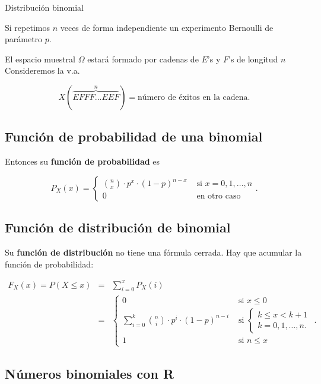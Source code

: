 \documentclass[]{book}
\begin{document}
 Distribución binomial

Si repetimos \(n\) veces de forma independiente un experimento Bernoulli de parámetro \(p\).

El espacio muestral \(\Omega\) estará formado por cadenas de \(E\)'s y \(F\)'s de longitud \(n\)
Consideremos la v.a.

\[X(\overbrace{EFFF\ldots EEF}^{n})=\mbox{número de éxitos en la cadena}.\]

\hypertarget{funciuxf3n-de-probabilidad-de-una-binomial}{%
\subsection{Función de probabilidad de una binomial}\label{funciuxf3n-de-probabilidad-de-una-binomial}}

Entonces su \textbf{función de probabilidad} es

\[
P_{X}(x)=\left\{
\begin{array}{ll}
{n\choose x}\cdot  p^x \cdot(1-p)^{n-x} &\mbox{ si } x=0,1,\ldots,n\\
0  & \mbox{ en otro caso}
\end{array}\right..
\]

\hypertarget{funciuxf3n-de-distribuciuxf3n-de-binomial}{%
\subsection{Función de distribución de binomial}\label{funciuxf3n-de-distribuciuxf3n-de-binomial}}

Su \textbf{función de distribución} no tiene una fórmula cerrada. Hay que acumular la función de probabilidad:

\[
\begin{eqnarray*}
F_{X}(x)=P(X\leq x) & = & \sum_{i=0}^x P_X(i)\\
& = & 
\left\{
\begin{array}{ll}
0 & \mbox{ si } x\leq 0\\\displaystyle
\sum_{i=0}^k {n\choose i}\cdot  p^i \cdot (1-p)^{n-i} & \mbox{ si } 
\left\{
  \begin{array}{l} 
  k\leq x< k+1\\
  k=0,1,\ldots,n.
  \end{array}
\right.\\
1 & \mbox{ si } n\leq x
\end{array}
\right..
\end{eqnarray*}
\]

\hypertarget{nuxfameros-binomiales-con-r}{%
\subsection{Números binomiales con R}\label{nuxfameros-binomiales-con-r}}
\end{document}
